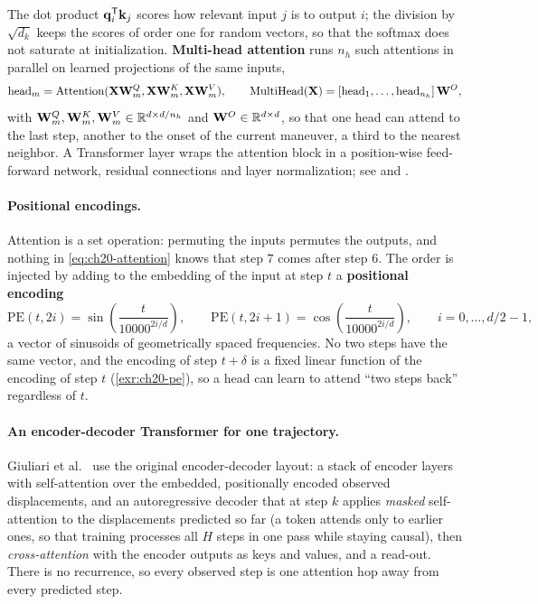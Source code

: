 The dot product $\mathbf{q}_i^{\mathsf{T}}\mathbf{k}_j$ scores how relevant input $j$ is to
output $i$; the division by $\sqrt{d_k}$ keeps the scores of order one for
random vectors, so that the softmax does not saturate at initialization.
\textbf{Multi-head attention} runs $n_h$ such
attentions in parallel on learned projections of the same inputs,
\begin{equation}
  \operatorname{head}_m = \operatorname{Attention}(\mathbf{X}\mathbf{W}_m^{Q}, \mathbf{X}\mathbf{W}_m^{K}, \mathbf{X}\mathbf{W}_m^{V}),
  \qquad
  \operatorname{MultiHead}(\mathbf{X}) = [\operatorname{head}_1, \dots, \operatorname{head}_{n_h}]\,\mathbf{W}^{O},
  \label{eq:ch20-multihead}
\end{equation}
with $\mathbf{W}_m^{Q}, \mathbf{W}_m^{K}, \mathbf{W}_m^{V} \in \mathbb{R}^{d \times d/n_h}$ and
$\mathbf{W}^{O} \in \mathbb{R}^{d \times d}$, so that one head can attend to the last
step, another to the onset of the current maneuver, a third to the nearest
neighbor. A Transformer layer wraps the attention block in a position-wise
feed-forward network, residual connections and layer normalization; see
\textcite{vaswani2017attention} and \textcite{goodfellow2016deep}.

\paragraph{Positional encodings.}
%
Attention is a set operation: permuting the inputs permutes the outputs, and
nothing in \cref{eq:ch20-attention} knows that step $7$ comes after step
$6$. The order is injected by adding to the embedding of the input at step
$t$ a \textbf{positional encoding}
\begin{equation}
  \mathrm{PE}(t, 2i) = \sin\!\left(\frac{t}{10000^{2i/d}}\right), \qquad
  \mathrm{PE}(t, 2i + 1) = \cos\!\left(\frac{t}{10000^{2i/d}}\right), \qquad i = 0, \dots, d/2 - 1,
  \label{eq:ch20-pe}
\end{equation}
a vector of sinusoids of geometrically spaced frequencies. No two steps have
the same vector, and the encoding of step $t + \delta$ is a fixed linear
function of the encoding of step $t$ (\cref{exr:ch20-pe}), so a head can
learn to attend ``two steps back'' regardless of $t$.

\paragraph{An encoder-decoder Transformer for one trajectory.}
Giuliari et al.~\cite{giuliari2021transformer} use the original
encoder-decoder layout: a stack of encoder layers with self-attention over
the embedded, positionally encoded observed displacements, and an
autoregressive decoder that at step $k$ applies \emph{masked} self-attention
to the displacements predicted so far (a token attends only to earlier ones,
so that training processes all $H$ steps in one pass while staying causal),
then \emph{cross-attention} with the encoder outputs as keys and values, and
a read-out. There is no recurrence, so every observed step is one attention
hop away from every predicted step.

